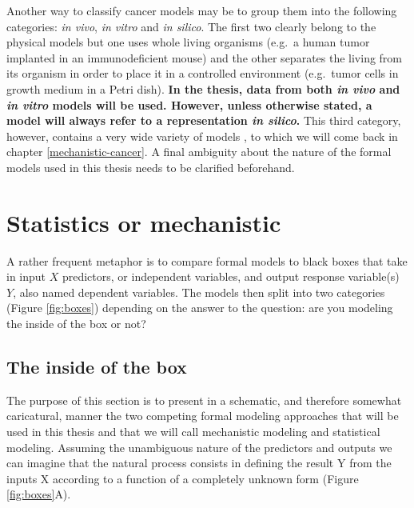 \documentclass[a4paper,12pt,twoside,onecolumn,openright,final,oldfontcommands]{memoir}
\begin{document}
Another way to classify cancer models may be to group them into the
following categories: \emph{in vivo}, \emph{in vitro} and \emph{in
silico}. The first two clearly belong to the physical models but one
uses whole living organisms (e.g.~a human tumor implanted in an
immunodeficient mouse) and the other separates the living from its
organism in order to place it in a controlled environment (e.g.~tumor
cells in growth medium in a Petri dish). \textbf{In the thesis, data
from both \emph{in vivo} and \emph{in vitro} models will be used.
However, unless otherwise stated, a model will always refer to a
representation \emph{in silico}.} This third category, however, contains
a very wide variety of models \citep{deisboeck2009silico}, to which we
will come back in chapter \ref{mechanistic-cancer}. A final ambiguity
about the nature of the formal models used in this thesis needs to be
clarified beforehand.

\section{Statistics or mechanistic}\label{stat-mech}

A rather frequent metaphor is to compare formal models to black boxes
that take in input \(X\) predictors, or independent variables, and
output response variable(s) \(Y\), also named dependent variables. The
models then split into two categories (Figure \ref{fig:boxes}) depending
on the answer to the question: are you modeling the inside of the box or
not?

\subsection{The inside of the box}\label{the-inside-of-the-box}

The purpose of this section is to present in a schematic, and therefore
somewhat caricatural, manner the two competing formal modeling
approaches that will be used in this thesis and that we will call
mechanistic modeling and statistical modeling. Assuming the unambiguous
nature of the predictors and outputs we can imagine that the natural
process consists in defining the result Y from the inputs X according to
a function of a completely unknown form (Figure \ref{fig:boxes}A).
\end{document}
